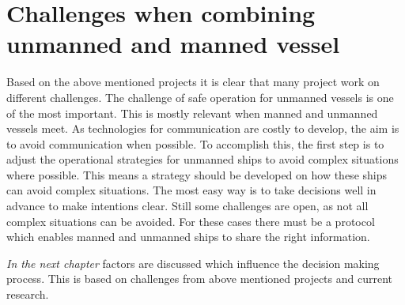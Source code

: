 
\section{Challenges when combining unmanned and manned vessel}
\label{sec:challenges-future}
Based on the above mentioned projects it is clear that many project work on different challenges. The challenge of safe operation for unmanned vessels is one of the most important. This is mostly relevant when manned and unmanned vessels meet. As technologies for communication are costly to develop, the aim is to avoid communication when possible. To accomplish this, the first step is to adjust the operational strategies for unmanned ships to avoid complex situations where possible. This means a strategy should be developed on how these ships can avoid complex situations. The most easy way is to take decisions well in advance to make intentions clear. Still some challenges are open, as not all complex situations can be avoided. For these cases there must be a protocol which enables manned and unmanned ships to share the right information.

\emph{In the next chapter} factors are discussed which influence the decision making process. This is based on challenges from above mentioned projects and current research. 

















